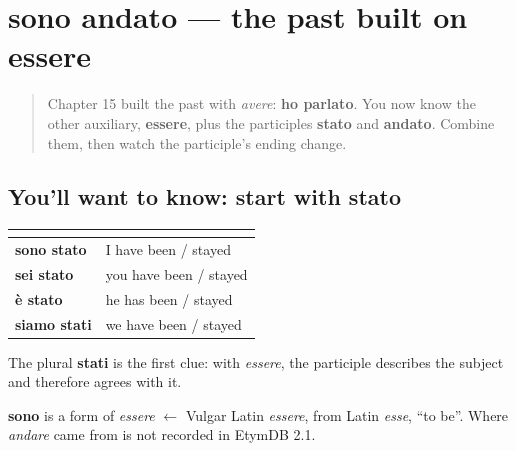 \section[sono andato]{sono andato — the past built on essere}

\label{lesson:IT-C16-passato-prossimo-essere}



\begin{quote}
Chapter 15 built the past with \emph{avere}: \textbf{ho parlato}. You now know the other auxiliary, \textbf{essere}, plus the participles \textbf{stato} and \textbf{andato}. Combine them, then watch the participle’s ending change.
\end{quote}

\subsection*{You'll want to know: start with stato}
\noindent
\begin{tabularx}{\linewidth}{@{}>{\raggedright\arraybackslash}X>{\raggedright\arraybackslash}X@{}}
\toprule
\textbf{} & \textbf{} \\
\midrule
\textbf{sono stato} & I have been / stayed \\
\textbf{sei stato} & you have been / stayed \\
\textbf{è stato} & he has been / stayed \\
\textbf{siamo stati} & we have been / stayed \\
\bottomrule
\end{tabularx}

The plural \textbf{stati} is the first clue: with \emph{essere}, the participle describes the subject and therefore agrees with it.

\begin{cousinweb}
\textbf{sono} is a form of \emph{essere} $\leftarrow$ Vulgar Latin \emph{essere}, from Latin \emph{esse}, \textquotedblleft{}to be\textquotedblright{}. Where \emph{andare} came from is not recorded in EtymDB 2.1.
\end{cousinweb}

